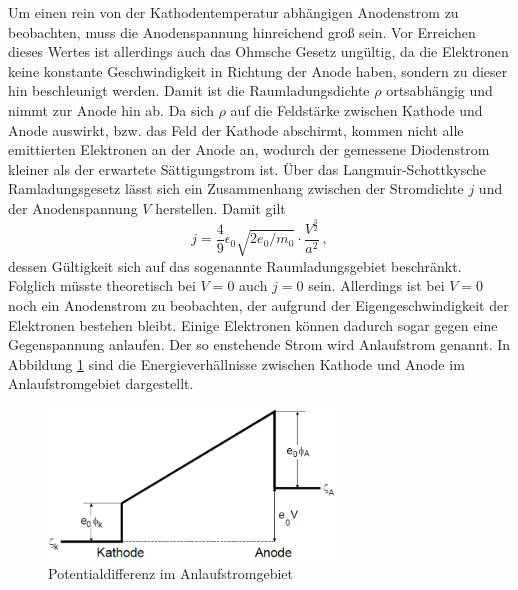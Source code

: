 \FloatBarrier
Um einen rein von der Kathodentemperatur abhängigen Anodenstrom zu beobachten, muss die Anodenspannung hinreichend groß sein. Vor Erreichen dieses 
Wertes ist allerdings auch das Ohmsche Gesetz ungültig, da die Elektronen keine konstante Geschwindigkeit in Richtung der Anode haben, sondern 
zu dieser hin beschleunigt werden. Damit ist die Raumladungsdichte $\rho$ ortsabhängig und nimmt zur Anode hin ab. Da sich $\rho$ auf die 
Feldstärke zwischen Kathode und Anode auswirkt, bzw. das Feld der Kathode abschirmt, kommen nicht alle emittierten Elektronen an der Anode an,
wodurch der gemessene Diodenstrom kleiner als der erwartete Sättigungstrom ist. Über das Langmuir-Schottkysche Ramladungsgesetz lässt sich ein 
Zusammenhang zwischen der Stromdichte $j$ und der Anodenspannung $V$ herstellen. Damit gilt 
\begin{equation}
    j = \frac{4}9 \epsilon_0 \sqrt{2e_0/m_0}\cdot \frac{V^{\frac{3}2}}{a^2}\,,
    \label{eqn:langmuir}
\end{equation}
dessen Gültigkeit sich auf das sogenannte Raumladungsgebiet beschränkt. Folglich müsste theoretisch bei $V=0$ auch $j=0$ sein. Allerdings 
ist bei $V=0$ noch ein Anodenstrom zu beobachten, der aufgrund der Eigengeschwindigkeit der Elektronen bestehen bleibt. Einige Elektronen 
können dadurch sogar gegen eine Gegenspannung anlaufen. Der so enstehende Strom wird Anlaufstrom genannt. In Abbildung \ref{fig:anlauf} sind 
die Energieverhällnisse zwischen Kathode und Anode im Anlaufstromgebiet dargestellt. 
\begin{figure}
    \centering
    \includegraphics[height=4cm]{data/potdiff.png}
    \caption{Potentialdifferenz im Anlaufstromgebiet}
    \label{fig:anlauf}
\end{figure}
\FloatBarrier

